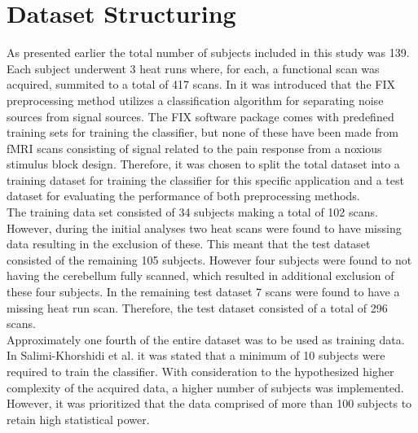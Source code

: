 \section{Dataset Structuring}

As presented earlier the total number of subjects included in this study was 139. Each subject underwent 3 heat runs where, for each, a functional scan was acquired, summited to a total of 417 scans. In  it was introduced that the FIX preprocessing method utilizes a classification algorithm for separating noise sources from signal sources. The FIX software package comes with predefined training sets for training the classifier, but none of these have been made from fMRI scans consisting of signal related to the pain response from a noxious stimulus block design. Therefore, it was chosen to split the total dataset into a training dataset for training the classifier for this specific application and a test dataset for evaluating the performance of both preprocessing methods. \\
The training data set consisted of 34 subjects making a total of 102 scans. However, during the initial analyses two heat scans were found to have missing data resulting in the exclusion of these. This meant that the test dataset consisted of the remaining 105 subjects. However four subjects were found to not having the cerebellum fully scanned, which resulted in additional exclusion of these four subjects. In the remaining test dataset 7 scans were found to have a missing heat run scan.  Therefore, the test dataset consisted of a total of 296 scans.  \\
Approximately one fourth of the entire dataset was to be used as training data. In Salimi-Khorshidi et al. \cite{Salimi-Khorshidi2014} it was stated that a minimum of 10 subjects were required to train the classifier. With consideration to the hypothesized higher complexity of the acquired data, a higher number of subjects was implemented. However, it was prioritized that the data comprised of more than 100 subjects to retain high statistical power.
%
